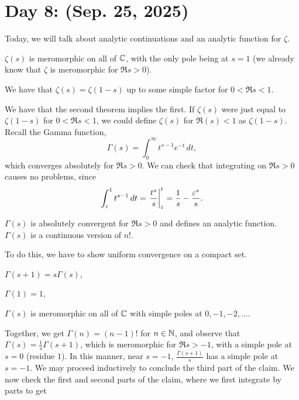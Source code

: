 \section{Day 8: (Sep. 25, 2025)}
Today, we will talk about analytic continuations and an analytic function for $\zeta$.
\begin{theorem}
    $\zeta(s)$ is meromorphic on all of $\mathbb C$, with the only pole being at $s = 1$ (we already know that $\zeta$ is meromorphic for $\Re s > 0$).
\end{theorem}
\begin{theorem}
    We have that $\zeta(s) = \zeta(1 - s)$ up to some simple factor for $0 < \Re s < 1$.
\end{theorem}
\noindent We have that the second theorem implies the first. If $\zeta(s)$ were just equal to $\zeta(1-s)$ for $0 < \Re s < 1$, we could define $\zeta(s)$ for $\Re(s) < 1$ as $\zeta(1 - s)$.
\\[8pt]
Recall the Gamma function,
\[ \Gamma(s) = \int_0^\infty t^{s-1} e^{-t} \, dt, \]
which converges absolutely for $\Re s > 0$. We can check that integrating on $\Re s > 0$ causes no problems, since
\[ \int_\varepsilon^1 t^{s-1} \, dt = \left.\frac{t^s}{s}\right\rvert_{\varepsilon}^{t} = \frac{1}{s} - \frac{\varepsilon^s}{s}. \] \vspace{-12pt}
\begin{lemma}
    $\Gamma(s)$ is absolutely convergent for $\Re s > 0$ and defines an analytic function. $\Gamma(s)$ is a continuous version of $n!$.
\end{lemma}
\noindent To do this, we have to show uniform convergence on a compact set.
\begin{claim}
    \begin{parlist} \item $\Gamma(s + 1) = s \Gamma(s)$, \item $\Gamma(1) = 1$, \item $\Gamma(s)$ is meromorphic on all of $\mathbb C$ with simple poles at $0, -1, -2, \dots$. \end{parlist}
\end{claim}
\noindent Together, we get $\Gamma(n) = (n - 1)!$ for $n \in \mathbb N$, and observe that $\Gamma(s) = \frac{1}{s} \Gamma(s + 1)$, which is meromorphic for $\Re s > -1$, with a simple pole at $s = 0$ (residue $1$). In this manner, near $s = -1$, $\frac{\Gamma(s+1)}{s}$ has a simple pole at $s = -1$. We may proceed inductively to conclude the third part of the claim. We now check the first and second parts of the claim, where we first integrate by parts to get
